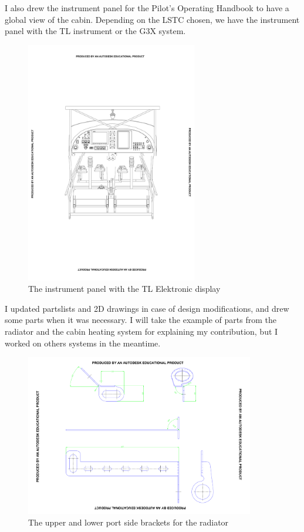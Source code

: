 \documentclass[11pt,a4paper]{article}
\begin{document}
\newpage

I also drew the instrument panel for the Pilot's Operating Handbook to have a global view of the cabin. Depending on the LSTC chosen, we have the instrument panel with the TL instrument or the G3X system.
\begin{figure}[ht!]
	\begin{center}
		\includegraphics[width=7.5cm,trim = 5cm 10cm 5cm 10cm, clip]{pics/PIC006.pdf}
		\caption{The instrument panel with the TL Elektronic display}
		\label{fig:PIC006}
	\end{center}
\end{figure}

\bigskip

I updated partslists and 2D drawings in case of design modifications, and drew some parts when it was necessary. I will take the example of parts from the radiator and the cabin heating system for explaining my contribution, but I worked on others systems in the meantime.

\begin{figure}[ht!]
	\begin{center}
		\includegraphics[width=10cm,trim = 2cm 1cm 2cm 1cm, clip]{pics/PIC007.pdf}
		\caption{The upper and lower port side brackets for the radiator}
		\label{fig:PIC007}
	\end{center}
\end{figure}
\end{document}

